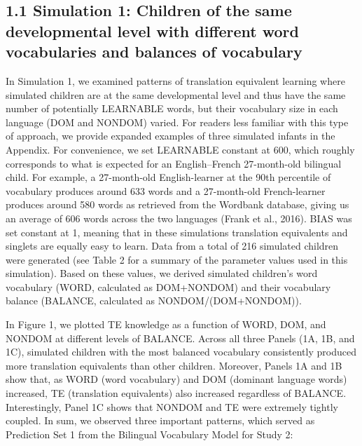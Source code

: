 \documentclass[
  english,
  ,man,floatsintext]{apa6}
\begin{document}
\hypertarget{simulation-1-children-of-the-same-developmental-level-with-different-word-vocabularies-and-balances-of-vocabulary}{%
\subsection{1.1 Simulation 1: Children of the same developmental level with different word vocabularies and balances of vocabulary}\label{simulation-1-children-of-the-same-developmental-level-with-different-word-vocabularies-and-balances-of-vocabulary}}

In Simulation 1, we examined patterns of translation equivalent learning where simulated children are at the same developmental level and thus have the same number of potentially LEARNABLE words, but their vocabulary size in each language (DOM and NONDOM) varied. For readers less familiar with this type of approach, we provide expanded examples of three simulated infants in the Appendix. For convenience, we set LEARNABLE constant at 600, which roughly corresponds to what is expected for an English--French 27-month-old bilingual child. For example, a 27-month-old English-learner at the 90th percentile of vocabulary produces around 633 words and a 27-month-old French-learner produces around 580 words as retrieved from the Wordbank database, giving us an average of 606 words across the two languages (Frank et al., 2016). BIAS was set constant at 1, meaning that in these simulations translation equivalents and singlets are equally easy to learn. Data from a total of 216 simulated children were generated (see Table 2 for a summary of the parameter values used in this simulation). Based on these values, we derived simulated children's word vocabulary (WORD, calculated as DOM+NONDOM) and their vocabulary balance (BALANCE, calculated as NONDOM/(DOM+NONDOM)).

In Figure 1, we plotted TE knowledge as a function of WORD, DOM, and NONDOM at different levels of BALANCE. Across all three Panels (1A, 1B, and 1C), simulated children with the most balanced vocabulary consistently produced more translation equivalents than other children. Moreover, Panels 1A and 1B show that, as WORD (word vocabulary) and DOM (dominant language words) increased, TE (translation equivalents) also increased regardless of BALANCE. Interestingly, Panel 1C shows that NONDOM and TE were extremely tightly coupled. In sum, we observed three important patterns, which served as Prediction Set 1 from the Bilingual Vocabulary Model for Study 2:
\end{document}
